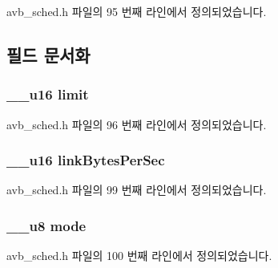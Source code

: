 avb\+\_\+sched.\+h 파일의 95 번째 라인에서 정의되었습니다.



\subsection{필드 문서화}
\subsubsection[{\texorpdfstring{limit}{limit}}]{\setlength{\rightskip}{0pt plus 5cm}\+\_\+\+\_\+u16 limit}\hypertarget{structtc__avb__qopt_a7e8fb1e66756150a9657fd6724d57fe6}{}\label{structtc__avb__qopt_a7e8fb1e66756150a9657fd6724d57fe6}


avb\+\_\+sched.\+h 파일의 96 번째 라인에서 정의되었습니다.

\subsubsection[{\texorpdfstring{link\+Bytes\+Per\+Sec}{linkBytesPerSec}}]{\setlength{\rightskip}{0pt plus 5cm}\+\_\+\+\_\+u16 link\+Bytes\+Per\+Sec}\hypertarget{structtc__avb__qopt_a4f0a21b15ac402ff1f0d52d9ed33057e}{}\label{structtc__avb__qopt_a4f0a21b15ac402ff1f0d52d9ed33057e}


avb\+\_\+sched.\+h 파일의 99 번째 라인에서 정의되었습니다.

\subsubsection[{\texorpdfstring{mode}{mode}}]{\setlength{\rightskip}{0pt plus 5cm}\+\_\+\+\_\+u8 mode}\hypertarget{structtc__avb__qopt_a10043a7b4ed103bf3f7400423cd3ee38}{}\label{structtc__avb__qopt_a10043a7b4ed103bf3f7400423cd3ee38}


avb\+\_\+sched.\+h 파일의 100 번째 라인에서 정의되었습니다.

